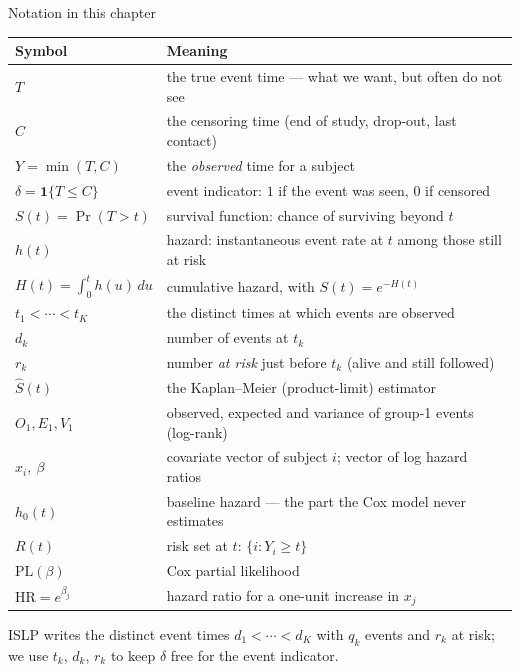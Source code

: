 \documentclass[aspectratio=169,11pt]{beamer}
\begin{document}
\begin{frame}{Notation in this chapter}
  \scriptsize
  \begin{center}
  \begin{tabular}{@{}ll@{}}
    \toprule
    \textbf{Symbol} & \textbf{Meaning} \\
    \midrule
    $T$ & the true event time --- what we want, but often do not see \\
    $C$ & the censoring time (end of study, drop-out, last contact) \\
    $Y=\min(T,C)$ & the \emph{observed} time for a subject \\
    $\delta=\mathbf{1}\{T\le C\}$ & event indicator: $1$ if the event was seen, $0$ if censored \\
    $S(t)=\Pr(T>t)$ & survival function: chance of surviving beyond $t$ \\
    $h(t)$ & hazard: instantaneous event rate at $t$ among those still at risk \\
    $H(t)=\int_0^t h(u)\,du$ & cumulative hazard, with $S(t)=e^{-H(t)}$ \\
    $t_1<\cdots<t_K$ & the distinct times at which events are observed \\
    $d_k$ & number of events at $t_k$ \\
    $r_k$ & number \emph{at risk} just before $t_k$ (alive and still followed) \\
    $\hat S(t)$ & the Kaplan--Meier (product-limit) estimator \\
    $O_1,E_1,V_1$ & observed, expected and variance of group-1 events (log-rank) \\
    $x_i,\ \beta$ & covariate vector of subject $i$; vector of log hazard ratios \\
    $h_0(t)$ & baseline hazard --- the part the Cox model never estimates \\
    $R(t)$ & risk set at $t$: $\{i : Y_i\ge t\}$ \\
    $\mathrm{PL}(\beta)$ & Cox partial likelihood \\
    $\mathrm{HR}=e^{\beta_j}$ & hazard ratio for a one-unit increase in $x_j$ \\
    \bottomrule
  \end{tabular}
  \end{center}
  {\tiny ISLP writes the distinct event times $d_1<\cdots<d_K$ with $q_k$ events and $r_k$ at risk; we use $t_k$, $d_k$, $r_k$ to keep $\delta$ free for the event indicator.}
\end{frame}
\end{document}
